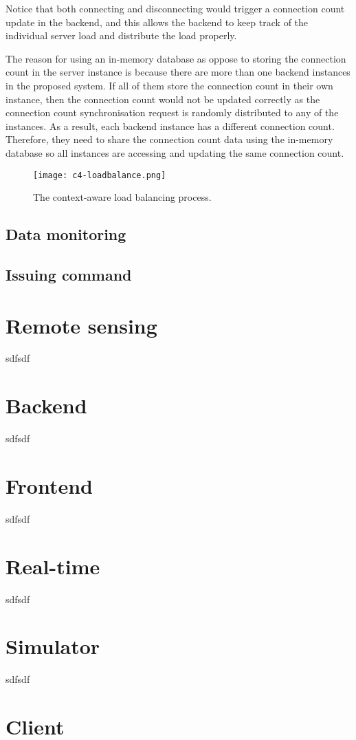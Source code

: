 \documentclass[../thesis.tex]{subfiles}
\begin{document}
Notice that both connecting and disconnecting would trigger a connection count update in the backend, and this allows the backend to keep track of the individual server load and distribute the load properly. 

The reason for using an in-memory database as oppose to storing the connection count in the server instance is because there are more than one backend instances in the proposed system. If all of them store the connection count in their own instance, then the connection count would not be updated correctly as the connection count synchronisation request is randomly distributed to any of the instances. As a result, each backend instance has a different connection count. Therefore, they need to share the connection count data using the in-memory database so all instances are accessing and updating the same connection count.  

\begin{figure}[!ht]
	\centering
	\texttt{[image: c4-loadbalance.png]}
	\caption{The context-aware load balancing process.}
	\label{fig:loadbalancing}
\end{figure}

\subsection{Data monitoring}



\subsection{Issuing command}




\newpage
\section{Remote sensing}
\label{sec:remoteSensing}
sdfsdf

\section{Backend}
\label{sec:backend}
sdfsdf
\section{Frontend}
\label{sec:frontend}
sdfsdf
\section{Real-time}
\label{sec:realtime}
sdfsdf

\section{Simulator}
\label{sec:simulator}
sdfsdf
\section{Client}
\label{sec:webClient}
\end{document}
